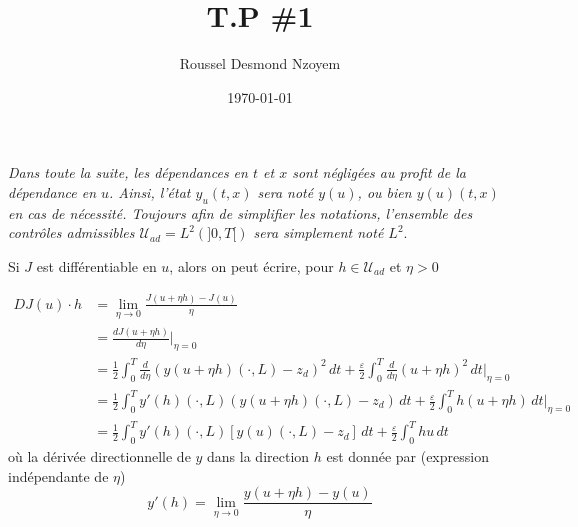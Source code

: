 \documentclass[
	french,
	11pt, %
]{fphw}
\title{T.P \#1} %
\author{Roussel Desmond Nzoyem} %
\date{\today} %
\institute{Université de Strasbourg \\ UFR de Mathématiques et Informatique} %
\begin{document}
\maketitle %

\textit{Dans toute la suite, les dépendances en $t$ et $x$ sont négligées au profit de la dépendance en $u$. Ainsi, l'état $y_u(t,x)$ sera noté $y(u)$, ou bien $y(u)(t,x)$ en cas de nécessité. Toujours afin de simplifier les notations, l'ensemble des contrôles admissibles $\mathcal{U}_{ad} = L^2(]0,T[)$ sera simplement noté $L^2$}.

Si $J$ est différentiable en $u$, alors on peut écrire, pour $h \in \mathcal{U}_{ad}$ et $\eta > 0 $

\begin{align*}
	DJ(u)\cdot h &= \lim_{\eta \rightarrow 0}{ \frac{J(u+\eta  h) - J(u)}{\eta }}  \\
	&= \frac{dJ(u+\eta h)}{d\eta} \bigg\rvert_{\eta = 0} \\
	&= \frac{1}{2} \int_0^T \frac{d}{d\eta} (y(u+\eta h)(\cdot,L) - z_d)^2\,dt + \frac{\varepsilon}{2} \int_0^T \frac{d}{d\eta} (u+\eta h)^2\,dt  \bigg\rvert_{\eta=0}  \\
	&= \frac{1}{2} \int_0^T y'(h)(\cdot,L) (y(u+\eta h)(\cdot,L) - z_d)\,dt + \frac{\varepsilon}{2} \int_0^T h (u+\eta h)\,dt  \bigg\rvert_{\eta=0} \\
	&= \frac{1}{2} \int_0^T y'(h)(\cdot,L) \left[y(u)(\cdot,L) - z_d\right]\,dt + \frac{\varepsilon}{2} \int_0^T h u\,dt
\end{align*}
où la dérivée directionnelle de $y$ dans la direction $h$ est donnée par (expression indépendante de $\eta$) $$y'(h) =  \lim_{\eta \rightarrow 0}{ \frac{y(u+\eta  h) - y(u)}{\eta }}$$
\end{document}
